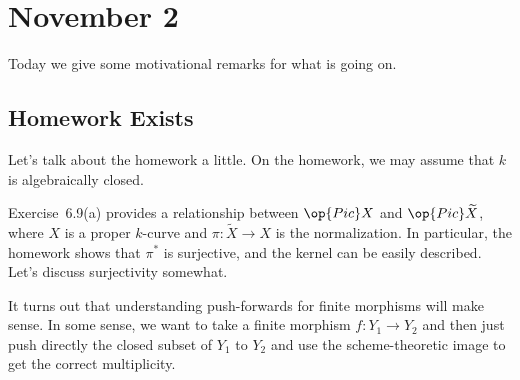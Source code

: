 \documentclass[../notes.tex]{subfiles}
\begin{document}
\section{November 2}

Today we give some motivational remarks for what is going on.

\subsection{Homework Exists}
Let's talk about the homework a little. On the homework, we may assume that $k$ is algebraically closed.

Exercise~6.9(a) provides a relationship between $\op{Pic}X$ and $\op{Pic}\widetilde X$, where $X$ is a proper $k$-curve and $\pi\colon\widetilde X\to X$ is the normalization. In particular, the homework shows that $\pi^*$ is surjective, and the kernel can be easily described. Let's discuss surjectivity somewhat.

It turns out that understanding push-forwards for finite morphisms will make sense. In some sense, we want to take a finite morphism $f\colon Y_1\to Y_2$ and then just push directly the closed subset of $Y_1$ to $Y_2$ and use the scheme-theoretic image to get the correct multiplicity.
\end{document}
